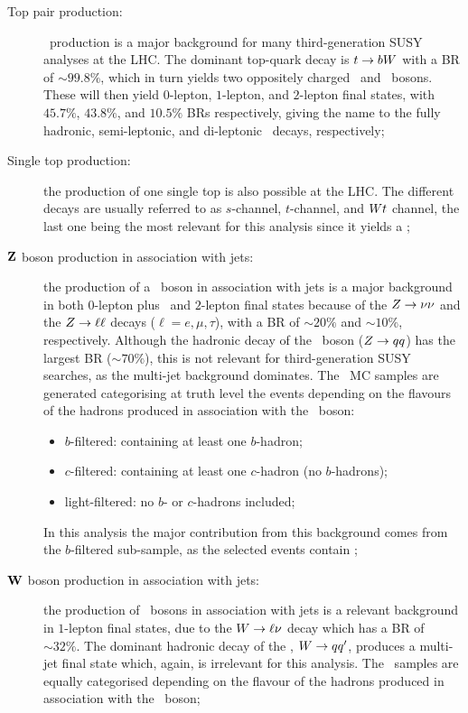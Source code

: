 		\begin{description}

			\item [Top pair production:] \ttbar\ production is a major background for many third-generation \ac{SUSY} analyses at the LHC. The dominant top-quark decay is $t \rightarrow b W$ with a \ac{BR} of $\sim 99.8\%$, which in turn yields two oppositely charged \bjs\ and \Wboson\ bosons. These will then yield $0$-lepton, $1$-lepton, and $2$-lepton final states, with $45.7\%$, $43.8\%$, and $10.5\%$ \acp{BR} respectively, giving the name to the fully hadronic, semi-leptonic, and di-leptonic \ttbar\ decays, respectively; 
			
			\item [Single top production:] the production of one single top is also possible at the LHC. The different decays are usually referred to as $s$-channel, $t$-channel, and $W t$ channel, the last one being the most relevant for this analysis since it yields a \Wboson; 

			\item [$\mathbf{Z}$ boson production in association with jets:] the production of a \Zboson\ boson in association with jets is a major background in both $0$-lepton plus \met\ and $2$-lepton final states because of the $Z \rightarrow \nu \nu$ and the $Z \rightarrow \ell \ell$ decays ($\ell = e,\mu,\tau$), with a \ac{BR} of $\sim 20\%$ and $\sim 10\%$, respectively. Although the hadronic decay of the \Zboson\ boson ($Z \rightarrow qq$) has the largest \ac{BR} ($\sim 70\%$), this is not relevant for third-generation \ac{SUSY} searches, as the multi-jet background dominates. The \Zjets\ \ac{MC} samples are generated categorising at truth level the events depending on the flavours of the hadrons produced in association with the \Zboson\ boson:
			\begin{itemize}
				\item $b$-filtered: containing at least one $b$-hadron;
				\item $c$-filtered: containing at least one $c$-hadron (no $b$-hadrons);
				\item light-filtered: no $b$- or $c$-hadrons included;
			\end{itemize} 
			In this analysis the major contribution from this background comes from the $b$-filtered sub-sample, as the selected events contain \bjs;

			\item [$\mathbf{W}$ boson production in association with jets:] the production of \Wboson\ bosons in association with jets is a relevant background in $1$-lepton final states, due to the $W \rightarrow \ell\nu$ decay which has a \ac{BR} of $\sim 32\%.$ The dominant hadronic decay of the \Wboson, $W \rightarrow qq'$, produces a multi-jet final state which, again, is irrelevant for this analysis. The \Wjets\ samples are equally categorised depending on the flavour of the hadrons produced in association with the \Wboson\ boson;


\end{description}
